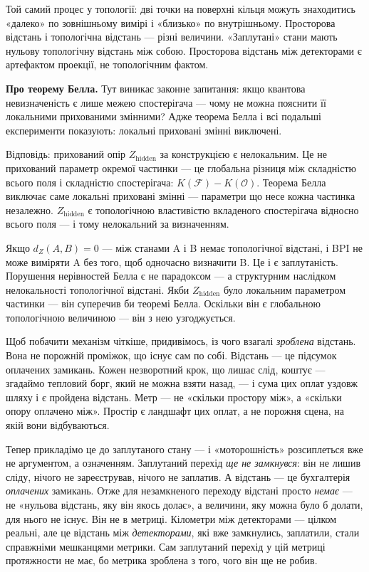 \documentclass[12pt, a4paper, openany]{book}
\begin{document}
\begin{analogybox}
Той самий процес у топології: дві точки на поверхні кільця можуть знаходитись «далеко» по зовнішньому вимірі і «близько» по внутрішньому. Просторова відстань і топологічна відстань --- різні величини. «Заплутані» стани мають нульову топологічну відстань між собою. Просторова відстань між детекторами є артефактом проекції, не топологічним фактом.
\end{analogybox}

\textbf{Про теорему Белла.} Тут виникає законне запитання: якщо квантова невизначеність є лише межею спостерігача — чому не можна пояснити її локальними прихованими змінними? Адже теорема Белла і всі подальші експерименти показують: локальні приховані змінні виключені.

Відповідь: прихований опір $Z_\text{hidden}$ за конструкцією є нелокальним. Це не прихований параметр окремої частинки — це глобальна різниця між складністю всього поля і складністю спостерігача: $K(\mathcal{F}) - K(\mathcal{O})$. Теорема Белла виключає саме локальні приховані змінні — параметри що несе кожна частинка незалежно. $Z_\text{hidden}$ є топологічною властивістю вкладеного спостерігача відносно всього поля — і тому нелокальний за визначенням.

Якщо $d_Z(A,B) = 0$ — між станами A і B немає топологічної відстані, і BPI не може виміряти A без того, щоб одночасно визначити B. Це і є заплутаність. Порушення нерівностей Белла є не парадоксом — а структурним наслідком нелокальності топологічної відстані. Якби $Z_\text{hidden}$ було локальним параметром частинки — він суперечив би теоремі Белла. Оскільки він є глобальною топологічною величиною — він з нею узгоджується.

Щоб побачити механізм чіткіше, придивімось, із чого взагалі \emph{зроблена} відстань. Вона не порожній проміжок, що існує сам по собі. Відстань --- це підсумок оплачених замикань. Кожен незворотний крок, що лишає слід, коштує --- згадаймо тепловий борг, який не можна взяти назад, --- і сума цих оплат уздовж шляху і є пройдена відстань. Метр --- не «скільки простору між», а «скільки опору оплачено між». Простір є ландшафт цих оплат, а не порожня сцена, на якій вони відбуваються.

Тепер прикладімо це до заплутаного стану --- і «моторошність» розсиплеться вже не аргументом, а означенням. Заплутаний перехід \emph{ще не замкнувся}: він не лишив сліду, нічого не зареєстрував, нічого не заплатив. А відстань --- це бухгалтерія \emph{оплачених} замикань. Отже для незамкненого переходу відстані просто \emph{немає} --- не «нульова відстань, яку він якось долає», а величини, яку можна було б долати, для нього не існує. Він не в метриці. Кілометри між детекторами --- цілком реальні, але це відстань між \emph{детекторами}, які вже замкнулись, заплатили, стали справжніми мешканцями метрики. Сам заплутаний перехід у цій метриці протяжности не має, бо метрика зроблена з того, чого він ще не робив.
\end{document}
